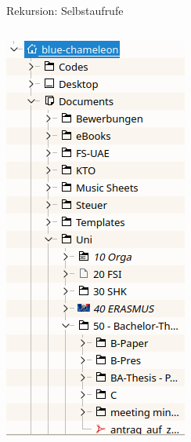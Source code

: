 \begin{frame}[t,fragile]{Rekursion: Selbstaufrufe}
\begin{columns}[T]
\includegraphics[width=\linewidth]{./gfx/foldertree}
%
\end{columns}
%
\end{frame}

